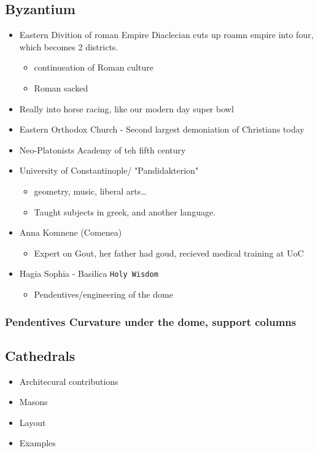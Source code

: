 \documentclass[11pt]{article}
\begin{document}
\subsection{Byzantium}
\label{sec-9-2}
\begin{itemize}
\item Eastern Divition of roman Empire Diaclecian cuts up roamn empire into four, which becomes 2 districts.
\begin{itemize}
\item continueation of Roman culture
\item Roman sacked
\end{itemize}
\item Really into horse racing, like our modern day super bowl

\item Eastern Orthodox Church - Second largest demoniation of Christians today
\item Neo-Platonists Academy of teh fifth century
\item University of Constantinople/ "Pandidakterion"
\begin{itemize}
\item geometry, music, liberal arts\ldots{}
\item Taught subjects in greek, and another language.
\end{itemize}
\item Anna Komnene (Comenea)
\begin{itemize}
\item Expert on Gout, her father had goud, recieved medical training at UoC
\end{itemize}
\item Hagia Sophia - Basilica \texttt{Holy Wisdom}
\begin{itemize}
\item Pendentives/engineering of the dome
\end{itemize}
\end{itemize}
\subsubsection{Pendentives Curvature under the dome, support columns}
\label{sec-9-2-1}
\subsection{Cathedrals}
\label{sec-9-3}
\begin{itemize}
\item Architecural contributions
\item Masons
\item Layout
\item Examples
\end{itemize}
\end{document}
